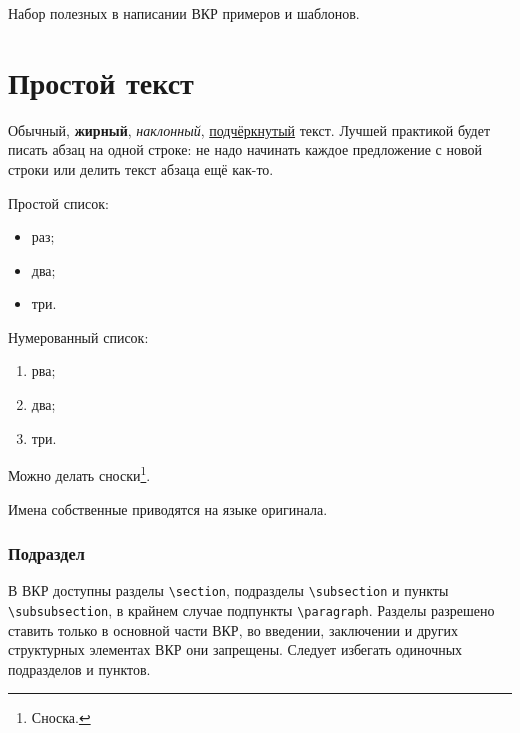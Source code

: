 \documentclass[a4paper, 14pt]{extreport}
\begin{document}
\tableofcontents

\bigskip

Набор полезных в написании ВКР примеров и шаблонов.


\section{Простой текст}

Обычный, \textbf{жирный}, \textit{наклонный}, \underline{подчёркнутый} текст. Лучшей практикой будет писать абзац на одной строке: не надо начинать каждое предложение с новой строки или делить текст абзаца ещё как-то. 

Простой список:
\begin{itemize}
    \item раз;
    \item два;
    \item три.
\end{itemize}
Нумерованный список:
\begin{enumerate}
    \item рва;
    \item два;
    \item три.
\end{enumerate}

Можно делать сноски\footnote{Сноска.}.

Имена собственные приводятся на языке оригинала.

\subsubsection{Подраздел}

В ВКР доступны разделы \verb!\section!, подразделы \verb!\subsection! и пункты \verb!\subsubsection!, в крайнем случае подпункты \verb!\paragraph!. Разделы разрешено ставить только в основной части ВКР, во введении, заключении и других структурных элементах ВКР они запрещены. Следует избегать одиночных подразделов и пунктов.
\end{document}

